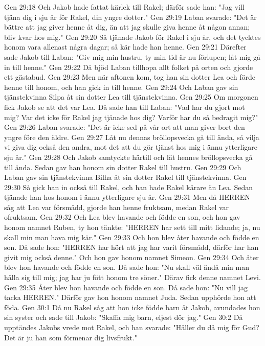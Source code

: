 Gen 29:18  Och Jakob hade fattat kärlek till Rakel; därför sade han: "Jag vill tjäna dig i sju år för Rakel, din yngre dotter."
Gen 29:19  Laban svarade: "Det är bättre att jag giver henne åt dig, än att jag skulle giva henne åt någon annan; bliv kvar hos mig."
Gen 29:20  Så tjänade Jakob för Rakel i sju år, och det tycktes honom vara allenast några dagar; så kär hade han henne.
Gen 29:21  Därefter sade Jakob till Laban: "Giv mig min hustru, ty min tid är nu förlupen; låt mig gå in till henne."
Gen 29:22  Då bjöd Laban tillhopa allt folket på orten och gjorde ett gästabud.
Gen 29:23  Men när aftonen kom, tog han sin dotter Lea och förde henne till honom, och han gick in till henne.
Gen 29:24  Och Laban gav sin tjänstekvinna Silpa åt sin dotter Lea till tjänstekvinna.
Gen 29:25  Om morgonen fick Jakob se att det var Lea. Då sade han till Laban: "Vad har du gjort mot mig? Var det icke för Rakel jag tjänade hos dig? Varför har du så bedragit mig?"
Gen 29:26  Laban svarade: "Det är icke sed på vår ort att man giver bort den yngre före den äldre.
Gen 29:27  Låt nu dennas bröllopsvecka gå till ända, så vilja vi giva dig också den andra, mot det att du gör tjänst hos mig i ännu ytterligare sju år."
Gen 29:28  Och Jakob samtyckte härtill och lät hennes bröllopsvecka gå till ända. Sedan gav han honom sin dotter Rakel till hustru.
Gen 29:29  Och Laban gav sin tjänstekvinna Bilha åt sin dotter Rakel till tjänstekvinna.
Gen 29:30  Så gick han in också till Rakel, och han hade Rakel kärare än Lea. Sedan tjänade han hos honom i ännu ytterligare sju år.
Gen 29:31  Men då HERREN såg att Lea var försmådd, gjorde han henne fruktsam, medan Rakel var ofruktsam.
Gen 29:32  Och Lea blev havande och födde en son, och hon gav honom namnet Ruben, ty hon tänkte: "HERREN har sett till mitt lidande; ja, nu skall min man hava mig kär."
Gen 29:33  Och hon blev åter havande och födde en son. Då sade hon: "HERREN har hört att jag har varit försmådd, därför har han givit mig också denne." Och hon gav honom namnet Simeon.
Gen 29:34  Och åter blev hon havande och födde en son. Då sade hon: "Nu skall väl ändå min man hålla sig till mig; jag har ju fött honom tre söner." Därav fick denne namnet Levi.
Gen 29:35  Åter blev hon havande och födde en son. Då sade hon: "Nu vill jag tacka HERREN." Därför gav hon honom namnet Juda. Sedan upphörde hon att föda.
Gen 30:1  Då nu Rakel såg att hon icke födde barn åt Jakob, avundades hon sin syster och sade till Jakob: "Skaffa mig barn, eljest dör jag."
Gen 30:2  Då upptändes Jakobs vrede mot Rakel, och han svarade: "Håller du då mig för Gud? Det är ju han som förmenar dig livsfrukt."
